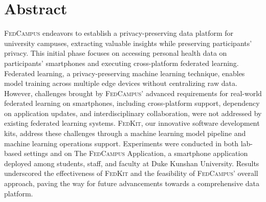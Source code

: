 \documentclass[11pt,a4paper,oneside]{report}
\newcommand{\instructions}[1]{{\color{orange}\itshape #1}}
\renewcommand{\instructions}[1]{} %
\newcommand{\fedcampus}{\textsc{FedCampus}\xspace}
\newcommand{\fedkit}{\textsc{FedKit}\xspace}
\begin{document}

\clearpage
{}


\setcounter{tocdepth}{0} %
\tableofcontents


\chapter*{Abstract}


\instructions{Abstract (English): 150 -- 200 words. An abstract is a brief
    statement of the problem or the purpose of the research. It should indicate
    the theoretical work or experimental plan used, summarize principal findings
    of the research, and point out major conclusions. Appropriate safety
    information should be included when applicable. This should be the section
    you write last to be sure that it accurately reflects the content of the
    document.}

\fedcampus endeavors to establish a privacy-preserving data platform for
university campuses,
extracting valuable insights while preserving participants' privacy.
This initial phase focuses on accessing personal health data on participants'
smartphones and executing cross-platform federated learning. Federated learning,
a privacy-preserving machine learning technique,
enables model training across multiple edge devices without centralizing raw
data. However,
challenges brought by \fedcampus' advanced requirements for real-world federated
learning on smartphones, including cross-platform support,
dependency on application updates, and interdisciplinary collaboration,
were not addressed by existing federated learning systems. \fedkit,
our innovative software development kits,
address these challenges through a machine learning model pipeline and machine
learning operations support.
Experiments were conducted in both lab-based settings and on The \fedcampus
Application, a smartphone application deployed among students, staff,
and faculty at Duke Kunshan University. Results underscored the effectiveness of
\fedkit and the feasibility of \fedcampus' overall approach,
paving the way for future advancements towards a comprehensive data platform.
\end{document}
